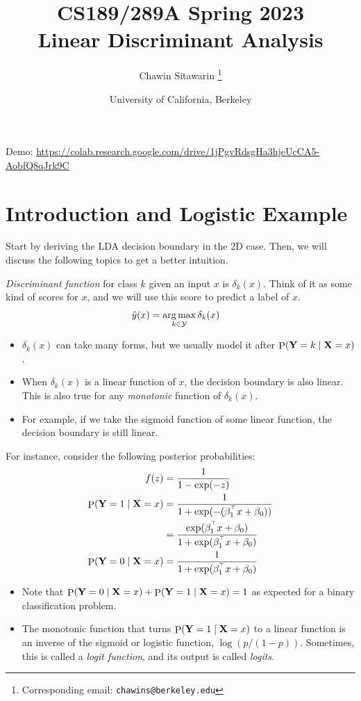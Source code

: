 \documentclass[letterpaper,12pt]{article}
\title{CS189/289A Spring 2023\\Linear Discriminant Analysis}
\author{
    Chawin Sitawarin \thanks{Corresponding email: \texttt{chawins@berkeley.edu}}
}
\date{
    University of California, Berkeley
}
\theoremstyle{plain}
\theoremstyle{definition}
\theoremstyle{remark}
\def\P{\mathop{\mathrm{P}}}
\begin{document}
\maketitle

Demo: \url{https://colab.research.google.com/drive/1jPgvRdsgHa3hjeUcCA5-AobfQ8qJrk9C}

\section{Introduction and Logistic Example}

Start by deriving the LDA decision boundary in the 2D case. Then, we will discuss the following topics to get a better intuition.

\emph{Discriminant function} for class $k$ given an input $x$ is $\delta_k(x)$.
Think of it as some kind of scores for $x$, and we will use this score to predict a label of $x$.
\begin{align}
    \hat{y}(x) & = \operatorname*{arg\,max}_{k \in \mathcal{Y}} \delta_k(x)
\end{align}

\begin{itemize}[leftmargin=*]
    \item $\delta_k(x)$ can take many forms, but we usually model it after $\P(\rmY = k \mid \rmX = x)$.
    \item When $\delta_k(x)$ is a linear function of $x$, the decision boundary is also linear. This is also true for any \emph{monotonic} function of $\delta_k(x)$.
    \item For example, if we take the sigmoid function of some linear function, the decision boundary is still linear.
\end{itemize}

For instance, consider the following posterior probabilities:
\begin{align}
    f(z)                       & = \frac{1}{1 - \exp(-z)}                                                \\
    \P(\rmY = 1 \mid \rmX = x) & = \frac{1}{1 + \exp(-(\beta_1^\T x + \beta_0))}                         \\
                               & = \frac{\exp(\beta_1^\T x + \beta_0)}{1 + \exp(\beta_1^\T x + \beta_0)} \\
    \P(\rmY = 0 \mid \rmX = x) & = \frac{1}{1 + \exp(\beta_1^\T x + \beta_0)}
\end{align}
\begin{itemize}[leftmargin=*]
    \item Note that $\P(\rmY = 0 \mid \rmX = x) + \P(\rmY = 1 \mid \rmX = x) = 1$ as expected for a binary classification problem.
    \item The monotonic function that turns $\P(\rmY = 1 \mid \rmX = x)$ to a linear function is an inverse of the sigmoid or logistic function, $\log(p/(1-p))$. Sometimes, this is called a \emph{logit function}, and its output is called \emph{logits}.
\end{itemize}
\end{document}
